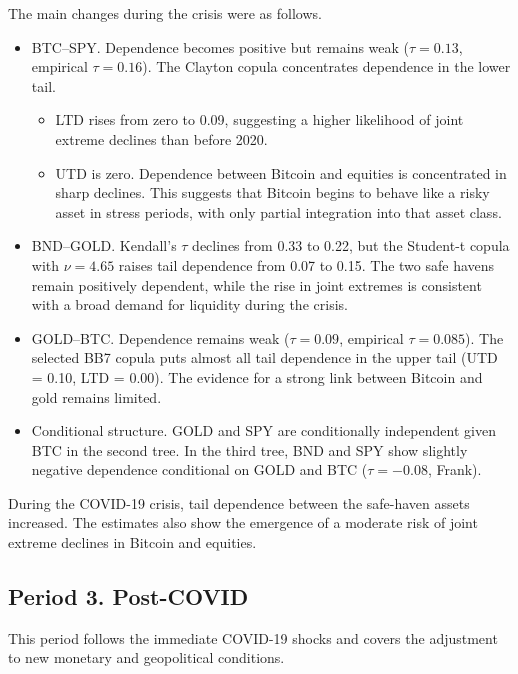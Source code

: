 \documentclass[12pt,a4paper]{article}
\begin{document}
The main changes during the crisis were as follows.
\begin{itemize}
  \item BTC--SPY. Dependence becomes positive but remains weak ($\tau=0.13$, empirical $\tau=0.16$). The Clayton copula concentrates dependence in the lower tail.
  \begin{itemize}
    \item LTD rises from zero to 0.09, suggesting a higher likelihood of joint extreme declines than before 2020.
    \item UTD is zero. Dependence between Bitcoin and equities is concentrated in sharp declines. This suggests that Bitcoin begins to behave like a risky asset in stress periods, with only partial integration into that asset class.
  \end{itemize}
  \item BND--GOLD. Kendall's $\tau$ declines from 0.33 to 0.22, but the Student-t copula with $\nu=4.65$ raises tail dependence from 0.07 to 0.15. The two safe havens remain positively dependent, while the rise in joint extremes is consistent with a broad demand for liquidity during the crisis.
  \item GOLD--BTC. Dependence remains weak ($\tau=0.09$, empirical $\tau=0.085$). The selected BB7 copula puts almost all tail dependence in the upper tail (UTD = 0.10, LTD = 0.00). The evidence for a strong link between Bitcoin and gold remains limited.
  \item Conditional structure. GOLD and SPY are conditionally independent given BTC in the second tree. In the third tree, BND and SPY show slightly negative dependence conditional on GOLD and BTC ($\tau=-0.08$, Frank).
\end{itemize}
During the COVID-19 crisis, tail dependence between the safe-haven assets increased. The estimates also show the emergence of a moderate risk of joint extreme declines in Bitcoin and equities.

\subsection{Period 3. Post-COVID}\label{sec:p3}
This period follows the immediate COVID-19 shocks and covers the adjustment to new monetary and geopolitical conditions.
\end{document}
